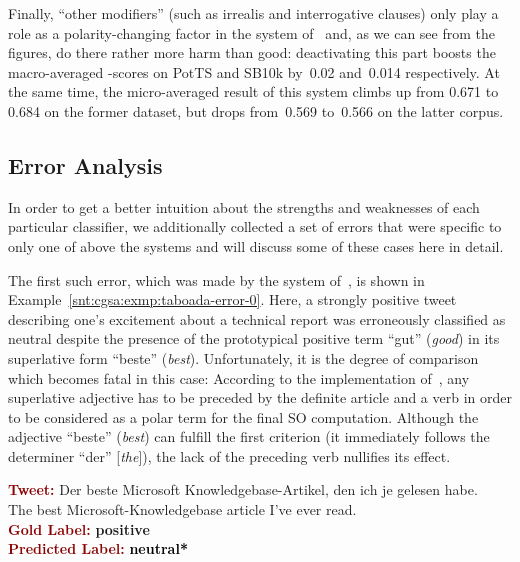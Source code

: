 Finally, ``other modifiers'' (such as irrealis and interrogative
clauses) only play a role as a polarity-changing factor in the system
of~\citet{Taboada:11} and, as we can see from the figures, do there
rather more harm than good: deactivating this part boosts the
macro-averaged \F{}-scores on PotTS and SB10k by~0.02 and~0.014
respectively.  At the same time, the micro-averaged result of this
system climbs up from 0.671 to 0.684 on the former dataset, but drops
from~0.569 to~0.566 on the latter corpus.

\subsection{Error Analysis}\label{subsec:cgsa:lex-methods:err-analysis}

In order to get a better intuition about the strengths and weaknesses
of each particular classifier, we additionally collected a set of
errors that were specific to only one of above the systems and will
discuss some of these cases here in detail.

The first such error, which was made by the system
of~\citet{Taboada:11}, is shown in
Example~\ref{snt:cgsa:exmp:taboada-error-0}.  Here, a strongly
positive tweet describing one's excitement about a technical report
was erroneously classified as neutral despite the presence of the
prototypical positive term ``gut'' (\emph{good}) in its superlative
form ``beste'' (\emph{best}).  Unfortunately, it is the degree of
comparison which becomes fatal in this case: According to the
implementation of~\citet{Taboada:11}, any superlative adjective has to
be preceded by the definite article and a verb in order to be
considered as a polar term for the final SO computation. Although the
adjective ``beste'' (\emph{best}) can fulfill the first criterion (it
immediately follows the determiner ``der'' [\emph{the}]), the lack of
the preceding verb nullifies its effect.

\begin{example}\label{snt:cgsa:exmp:taboada-error-0}
  \noindent\textup{\bfseries\textcolor{darkred}{Tweet:}} {\upshape Der beste Microsoft Knowledgebase-Artikel, den ich je gelesen habe.}\\
  \noindent The best Microsoft-Knowledgebase article I've ever read.\\[\exampleSep]
  \noindent\textup{\bfseries\textcolor{darkred}{Gold Label:}}\hspace*{4.3em}\textbf{%
    \upshape\textcolor{green3}{positive}}\\
 \noindent\textup{\bfseries\textcolor{darkred}{Predicted Label:}}\hspace*{2em}\textbf{%
    \upshape\textcolor{black}{neutral*}}
\end{example}


